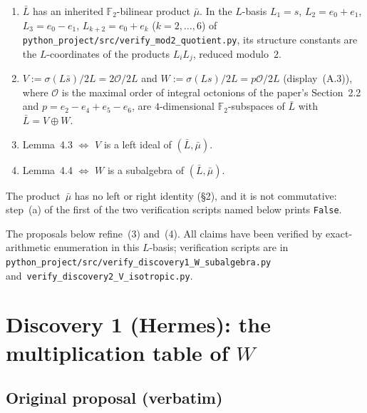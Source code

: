 \documentclass[11pt]{amsart}
\newcommand{\FF}{\mathbb{F}}
\begin{document}
\begin{enumerate}[label=(\arabic*)]
\item $\bar L$ has an inherited $\FF_2$-bilinear product $\bar\mu$.  In
  the $L$-basis $L_1 = s$, $L_2 = e_0 + e_1$, $L_3 = e_0 - e_1$,
  $L_{k+2} = e_0 + e_k$ ($k = 2, \ldots, 6$) of
  \texttt{python\_project/src/verify\_mod2\_quotient.py}, its structure
  constants are the $L$-coordinates of the products $L_i L_j$, reduced
  modulo~$2$.
\item $V := \sigma(L\bar s)/2L = 2\mathcal O/2L$ and
  $W := \sigma(Ls)/2L = p\mathcal O/2L$ (display~(A.3)), where
  $\mathcal O$ is the maximal order of integral octonions of the paper's
  Section~2.2 and $p = e_2 - e_4 + e_5 - e_6$, are $4$-dimensional
  $\FF_2$-subspaces of $\bar L$ with $\bar L = V \oplus W$.
\item Lemma~4.3 $\iff$ $V$ is a left ideal of $(\bar L, \bar\mu)$.
\item Lemma~4.4 $\iff$ $W$ is a subalgebra of $(\bar L, \bar\mu)$.
\end{enumerate}

The product~$\bar\mu$ has no left or right identity (\S2), and it is not
commutative: step~(a) of the first of the two verification scripts named
below prints \texttt{False}.

The proposals below refine~(3) and~(4). All claims have been verified
by exact-arithmetic enumeration in this $L$-basis;
verification scripts are in
\texttt{python\_project/src/verify\_discovery1\_W\_subalgebra.py}
and~\texttt{verify\_discovery2\_V\_isotropic.py}.

\section{Discovery 1 (Hermes): the multiplication table of $W$}

\subsection*{Original proposal (verbatim)}
\end{document}
